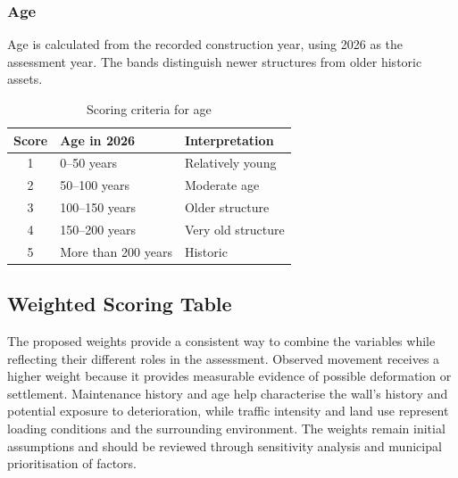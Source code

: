 \subsubsection{Age}

Age is calculated from the recorded construction year, using 2026 as the assessment year. The bands distinguish newer structures from older historic assets.

\begin{table}[htbp]
    \centering
    \caption{Scoring criteria for age}
    \vspace{2mm}
    \begin{tabularx}{\textwidth}{c X X}
        \toprule
        \textbf{Score} & \textbf{Age in 2026} & \textbf{Interpretation} \\
        \midrule
        1 & 0–50 years & Relatively young \\
        2 & 50–100 years & Moderate age \\
        3 & 100–150 years & Older structure \\
        4 & 150–200 years & Very old structure \\
        5 & More than 200 years & Historic \\
        \bottomrule
    \end{tabularx}
\end{table}

\subsection{Weighted Scoring Table}

The proposed weights provide a consistent way to combine the variables while reflecting their different roles in the assessment. Observed movement receives a higher weight because it provides measurable evidence of possible deformation or settlement. Maintenance history and age help characterise the wall's history and potential exposure to deterioration, while traffic intensity and land use represent loading conditions and the surrounding environment. The weights remain initial assumptions and should be reviewed through sensitivity analysis and municipal prioritisation of factors.


